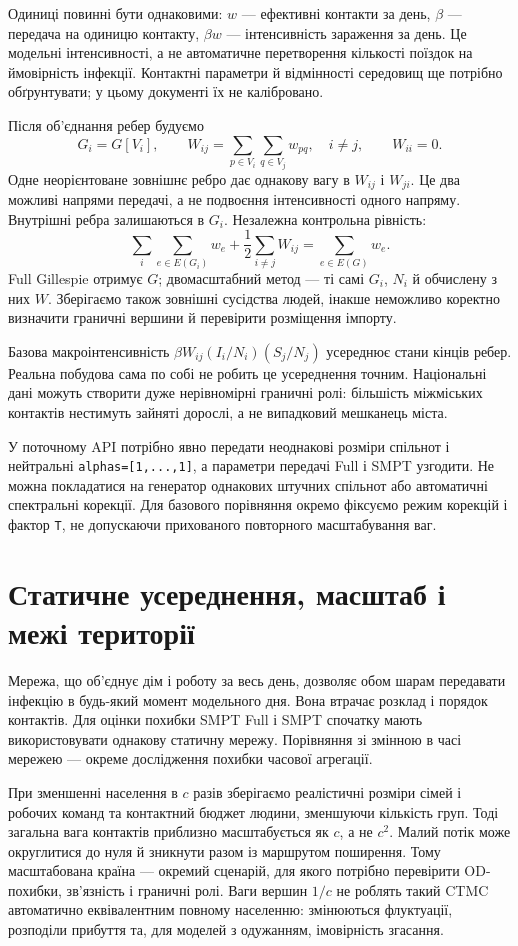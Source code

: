 \documentclass[11pt,a4paper]{article}
\begin{document}
Одиниці повинні бути однаковими: $w$ --- ефективні контакти за день, $\beta$ --- передача на одиницю контакту, $\beta w$ --- інтенсивність зараження за день. Це модельні інтенсивності, а не автоматичне перетворення кількості поїздок на ймовірність інфекції. Контактні параметри й відмінності середовищ ще потрібно обґрунтувати; у цьому документі їх не калібровано.

Після об'єднання ребер будуємо
\[
G_i=G[V_i],\qquad
W_{ij}=\sum_{p\in V_i}\sum_{q\in V_j}w_{pq},\quad i\ne j,
\qquad W_{ii}=0.
\]
Одне неорієнтоване зовнішнє ребро дає однакову вагу в $W_{ij}$ і $W_{ji}$. Це два можливі напрями передачі, а не подвоєння інтенсивності одного напряму. Внутрішні ребра залишаються в $G_i$. Незалежна контрольна рівність:
\[
\sum_i\sum_{e\in E(G_i)}w_e
+\frac12\sum_{i\ne j}W_{ij}=\sum_{e\in E(G)}w_e.
\]
Full Gillespie отримує $G$; двомасштабний метод --- ті самі $G_i$, $N_i$ й обчислену з них $W$. Зберігаємо також зовнішні сусідства людей, інакше неможливо коректно визначити граничні вершини й перевірити розміщення імпорту.

Базова макроінтенсивність $\beta W_{ij}(I_i/N_i)(S_j/N_j)$ усереднює стани кінців ребер. Реальна побудова сама по собі не робить це усереднення точним. Національні дані можуть створити дуже нерівномірні граничні ролі: більшість міжміських контактів нестимуть зайняті дорослі, а не випадковий мешканець міста.

У поточному API потрібно явно передати неоднакові розміри спільнот і нейтральні \texttt{alphas=[1,...,1]}, а параметри передачі Full і SMPT узгодити. Не можна покладатися на генератор однакових штучних спільнот або автоматичні спектральні корекції. Для базового порівняння окремо фіксуємо режим корекцій і фактор \texttt{T}, не допускаючи прихованого повторного масштабування ваг.

\section{Статичне усереднення, масштаб і межі території}
Мережа, що об'єднує дім і роботу за весь день, дозволяє обом шарам передавати інфекцію в будь-який момент модельного дня. Вона втрачає розклад і порядок контактів. Для оцінки похибки SMPT Full і SMPT спочатку мають використовувати однакову статичну мережу. Порівняння зі змінною в часі мережею --- окреме дослідження похибки часової агрегації.

При зменшенні населення в $c$ разів зберігаємо реалістичні розміри сімей і робочих команд та контактний бюджет людини, зменшуючи кількість груп. Тоді загальна вага контактів приблизно масштабується як $c$, а не $c^2$. Малий потік може округлитися до нуля й зникнути разом із маршрутом поширення. Тому масштабована країна --- окремий сценарій, для якого потрібно перевірити OD-похибки, зв'язність і граничні ролі. Ваги вершин $1/c$ не роблять такий CTMC автоматично еквівалентним повному населенню: змінюються флуктуації, розподіли прибуття та, для моделей з одужанням, імовірність згасання.
\end{document}
